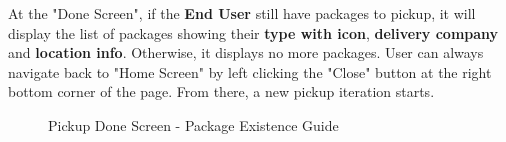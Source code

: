 At the "Done Screen", if the \textbf{End User} still have packages to pickup, it will display the list of packages showing their \textbf{type with icon}, \textbf{delivery company} and \textbf{location info}. Otherwise, it displays no more packages. 
User can always navigate back to "Home Screen" by left clicking the "Close" button at the right bottom corner of the page.
From there, a new pickup iteration starts.

\begin{figure}[H]
	\centering
	\hspace{5pt}
	\caption{Pickup Done Screen - Package Existence Guide}
	\label{fig:PickupHomeScreen-1}
\end{figure}

